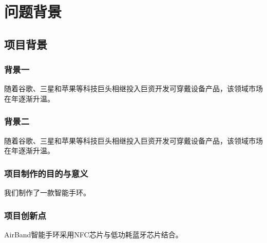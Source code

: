 \chapter{问题背景}
\section{项目背景}
\subsection{背景一}
随着谷歌、三星和苹果等科技巨头相继投入巨资开发可穿戴设备产品，该领域市场在年逐渐升温\cite{wu2013online}。


\subsection{背景二}
随着谷歌、三星和苹果等科技巨头相继投入巨资开发可穿戴设备产品，该领域市场在年逐渐升温。 

\subsection{项目制作的目的与意义}
我们制作了一款智能手环。

\subsection{项目创新点}
AirBand智能手环采用NFC芯片与低功耗蓝牙芯片结合。